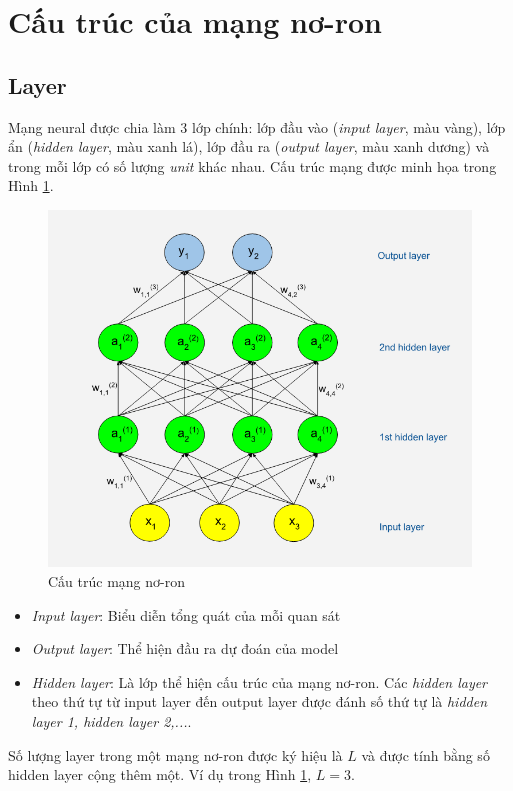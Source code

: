 \section{Cấu trúc của mạng nơ-ron}

\subsection{Layer}
Mạng neural  được chia làm 3 lớp chính: lớp đầu vào (\textit{input layer}, màu vàng), lớp ẩn (\textit{hidden layer}, màu xanh lá), lớp đầu ra (\textit{output layer}, màu xanh dương) và trong mỗi lớp có số lượng \textit{unit} khác nhau. Cấu trúc mạng được minh họa trong Hình \ref{fig:neuralNetworkStruct}.
\begin{center}
 	\begin{figure}[htp]
    \begin{center}
     \includegraphics[scale=0.5]{chap3/image/cautrucNN.png}
    \end{center}
    \caption{Cấu trúc mạng nơ-ron}
    \label{fig:neuralNetworkStruct}
    \end{figure}
\end{center}

\begin{itemize}
\setlength{\itemindent}{5mm}
	\item \textit{Input layer}: Biểu diễn tổng quát của mỗi quan sát
	\item \textit{Output layer}: Thể hiện đầu ra dự đoán của model
	\item \textit{Hidden layer}: Là lớp thể hiện cấu trúc của mạng nơ-ron. Các \textit{hidden layer} theo thứ tự từ input layer đến output layer được đánh số thứ tự là \textit{hidden layer 1, hidden layer 2,...}.
\end{itemize}\par
Số lượng layer trong một mạng nơ-ron được ký hiệu là $L$ và được tính bằng số hidden layer cộng thêm một. Ví dụ trong Hình \ref{fig:neuralNetworkStruct}, $L=3$.
